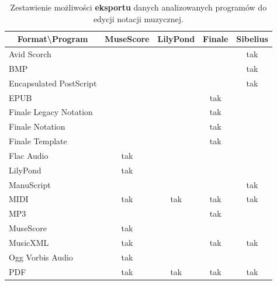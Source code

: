 \documentclass[polish,thesis,12pt]{dcsbook}
\begin{document}
\begin{center}
\begin{longtable}{|l|c|c|c|c|}
\caption{Zestawienie możliwości \textbf{eksportu} danych analizowanych programów do edycji notacji muzycznej.} \label{edytory-eksport} \\
\hline
\multicolumn{1}{|c|}{\textbf{Format{\textbackslash}Program}} & MuseScore & LilyPond & Finale & Sibelius \\ \hline
Avid Scorch                                   &           &          &        & tak      \\ \hline
BMP                                           &           &          &        & tak      \\ \hline
Encapsulated PostScript                       &           &          &        & tak      \\ \hline
EPUB                                          &           &          & tak    &          \\ \hline
Finale Legacy Notation                        &           &          & tak    &          \\ \hline
Finale Notation                               &           &          & tak    &          \\ \hline
Finale Template                               &           &          & tak    &          \\ \hline
Flac Audio                                    & tak       &          &        &          \\ \hline
LilyPond                                      & tak       &          &        &          \\ \hline
ManuScript                                    &           &          &        & tak      \\ \hline
MIDI                                          & tak       & tak      & tak    & tak      \\ \hline
MP3                                           &           &          & tak    &          \\ \hline
MuseScore                                     & tak       &          &        &          \\ \hline
MusicXML                                      & tak       &          & tak    & tak      \\ \hline
Ogg Vorbis Audio                              & tak       &          &        &          \\ \hline
PDF                                           & tak       & tak      & tak    & tak      \\ \hline

\end{longtable}
\end{center}
\end{document}
